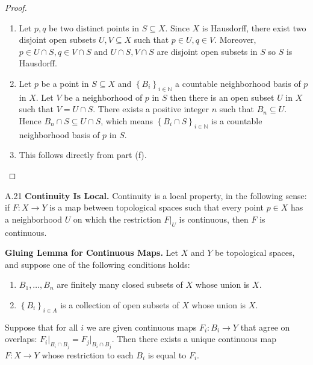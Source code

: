 \begin{proof}
\begin{enumerate}[itemsep=0pt,label={(\alph*)}]
              which means \( \mathcal{B}_{S} \) is a basis for the subspace topology on \( S \).
        \item Let \( p, q \) be two distinct points in \( S \subseteq X \). Since \( X \) is Hausdorff, there exist two disjoint open subsets \( U, V \subseteq X \) such that \( p \in U, q \in V \). Moreover, \( p \in U \cap S, q \in V \cap S \) and \( U \cap S, V \cap S \) are disjoint open subsets in \( S \) so \( S \) is Hausdorff.
        \item Let \( p \) be a point in \( S \subseteq X \) and \( {\left\{ B_{i} \right\}}_{i\in\mathbb{N}} \) a countable neighborhood basis of \( p \) in \( X \). Let \( V \) be a neighborhood of \( p \) in \( S \) then there is an open subset \(U\) in \(X\) such that \( V = U \cap S \). There exists a positive integer \( n \) such that \( B_{n} \subseteq U \). Hence \( B_{n} \cap S \subseteq U \cap S \), which means \( {\left\{ B_{i} \cap S \right\}}_{i\in\mathbb{N}} \) is a countable neighborhood basis of \( p \) in \( S \).
        \item This follows directly from part (f).
    \end{enumerate}
\end{proof}

\begin{exercise}{A.21}
    \textbf{Continuity Is Local.} Continuity is a local property, in the following sense: if \( F: X \to Y \) is a map between topological spaces such that every point \( p \in X \) has a neighborhood \( U \) on which the restriction \( F\vert_{U} \) is continuous, then \( F \) is continuous.

    \textbf{Gluing Lemma for Continuous Maps.} Let \( X \) and \( Y \) be topological spaces, and suppose one of the following conditions holds:
    \begin{enumerate}[itemsep=0pt,label={(\alph*)}]
        \item \( B_{1}, \ldots, B_{n} \) are finitely many closed subsets of \( X \) whose union is \( X \).
        \item \( {\left\{ B_{i} \right\}}_{i\in A} \) is a collection of open subsets of \( X \) whose union is \( X \).
    \end{enumerate}

    Suppose that for all \( i \) we are given continuous maps \( F_{i}: B_{i} \to Y \) that agree on overlaps: \( F_{i}\vert_{B_{i} \cap B_{j}} = F_{j}\vert_{B_{i} \cap B_{j}} \). Then there exists a unique continuous map \( F: X \to Y \) whose restriction to each \( B_{i} \) is equal to \( F_{i} \).
\end{exercise}

